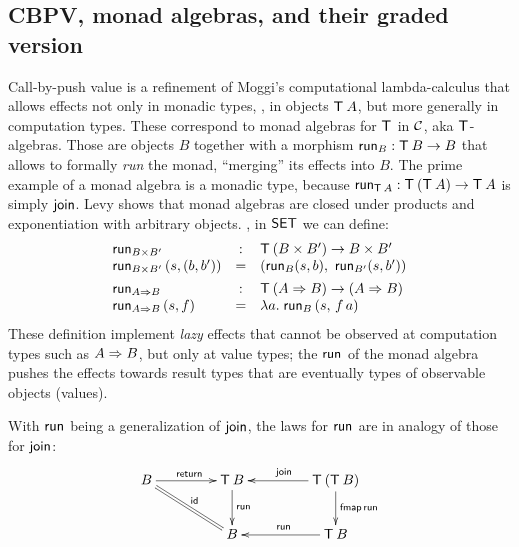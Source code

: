 \documentclass[acmsmall,review,anonymous]{acmart}\settopmatter{printfolios=true,printccs=false,printacmref=false}
\begin{document}
\subsection{CBPV, monad algebras, and their graded version}

Call-by-push value \cite{levy:hosc06} is a refinement of Moggi's
computational lambda-calculus \cite{moggi:infcomp91} that allows effects
not only in monadic types, \ie, in objects $\T\,A$, but more generally
in computation types.  These correspond to monad algebras for $\T$ in $\CC$,
aka $\T$-algebras.
Those are objects $B$ together with a morphism $\run[B] : \T\,B
\to B$ that allows to formally \emph{run} the monad, ``merging'' its
effects into $B$.
The prime example of a monad algebra is a monadic
type, because $\run[\T\,A] : \T\,(\T\,A) \to \T\,A$ is simply
$\tjoin$.  Levy \citeyearpar{levy:hosc06} shows that monad algebras are
closed under products and exponentiation with arbitrary objects.  \Eg,
in $\SET$ we can define:
\[
\begin{array}{lcl}
  \run[B \times B'] & : & \T\,(B \times B') \to B \times B' \\
  \run[B \times B']\, (s,(b,b')) & = & (\run[B] (s,b),\
                                           \run[B'] (s,b'))
\\[1ex]
  \run[A \To B] & : & \T\,(A \To B) \to (A \To B) \\
  \run[A \To B]\, (s,f) & = & \lambda a.\; \run[B]\,(s,\,f\,a)
\\
\end{array}
\]
These definition implement \emph{lazy} effects that cannot be observed
at computation types such as $A \To B$, but only at value types; the
$\run[]$ of the monad algebra pushes the effects towards result types
that are eventually types of observable objects (values).

With $\run[]$ being a generalization of $\tjoin$, the laws for $\run[]$
are in analogy of those for $\tjoin$:
\[
\xymatrix@C=10ex{
  B     \ar[r]^{\treturn} \ar@{=}[dr]^{\tid}
& \T\,B \ar[d]^{\run[]}
& \T\,(\T\,B) \ar[l]_{\tjoin} \ar[d]^{\tfmap\,\run[]}
\\
& B
& \T\,B \ar[l]_{\run[]}
}
\]
\end{document}
